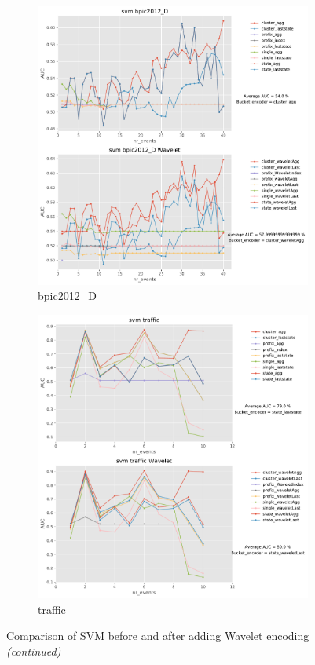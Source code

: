 \documentclass[twoside,11pt]{Latex/Classes/PhDthesisPSnPDF}
\begin{document}
\begin{figure}[!htbp]
	\medskip
	\begin{subfigure}{0.48\textwidth}
		\includegraphics[width=\linewidth]{images/wavelet/graphs2svm/bpic2012_D.pdf}	
		\caption{bpic2012\_D} 
	\end{subfigure}\hspace*{\fill}
	\begin{subfigure}{0.48\textwidth}
		\includegraphics[width=\linewidth]{images/wavelet/graphs2svm/traffic.pdf}
		\caption{traffic}
	\end{subfigure}
		\caption{Comparison of SVM before and after adding Wavelet encoding \textit{(continued)}}
	\label{fig:ws2}
\end{figure}
\end{document}
